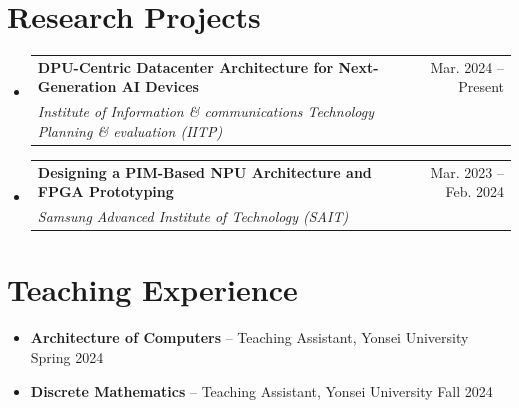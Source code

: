 \documentclass[11pt,a4paper]{article}
\makeatletter
\newenvironment{entries}[1][4pt]{\begin{itemize}[leftmargin=0pt, label={}, itemsep=#1, topsep=0pt]}{\end{itemize}}
\newcommand{\entry}[4]{%
  \item
  \begin{tabular*}{\linewidth}[t]{@{}l@{\extracolsep{\fill}}r@{}}
    \textbf{#1} & #2 \\
    \textit{\small #3} & \textit{\small #4} \\
  \end{tabular*}}
\newcommand{\oneline}[2]{\item #1 \hfill #2}
\makeatother
\begin{document}
\section{Research Projects}
\begin{entries}
  \entry{DPU-Centric Datacenter Architecture for Next-Generation AI Devices}{Mar. 2024 -- Present}
        {Institute of Information \& communications Technology Planning \& evaluation (IITP)}{}
  \entry{Designing a PIM-Based NPU Architecture and FPGA Prototyping}{Mar. 2023 -- Feb. 2024}
        {Samsung Advanced Institute of Technology (SAIT)}{}
\end{entries}

\section{Teaching Experience}
\begin{entries}[0pt]
  \oneline{\textbf{Architecture of Computers} -- Teaching Assistant, Yonsei University}{Spring 2024}
  \oneline{\textbf{Discrete Mathematics} -- Teaching Assistant, Yonsei University}{Fall 2024}
\end{entries}
\end{document}
